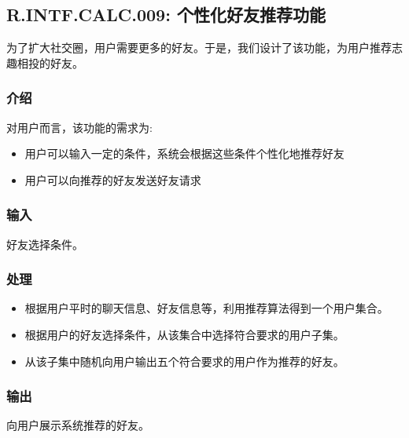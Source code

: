 \subsection{R.INTF.CALC.009: 个性化好友推荐功能}
为了扩大社交圈，用户需要更多的好友。于是，我们设计了该功能，为用户推荐志趣相投的好友。
\subsubsection{介绍}
对用户而言，该功能的需求为:
\begin{itemize}
  \item 用户可以输入一定的条件，系统会根据这些条件个性化地推荐好友
  \item 用户可以向推荐的好友发送好友请求
\end{itemize}
\subsubsection{输入}
好友选择条件。
\subsubsection{处理}
\begin{itemize}
  \item 根据用户平时的聊天信息、好友信息等，利用推荐算法得到一个用户集合。
  \item 根据用户的好友选择条件，从该集合中选择符合要求的用户子集。
  \item 从该子集中随机向用户输出五个符合要求的用户作为推荐的好友。
\end{itemize}
\subsubsection{输出}
向用户展示系统推荐的好友。